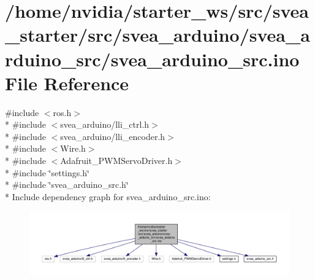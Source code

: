 \hypertarget{svea__arduino__src_8ino}{}\section{/home/nvidia/starter\+\_\+ws/src/svea\+\_\+starter/src/svea\+\_\+arduino/svea\+\_\+arduino\+\_\+src/svea\+\_\+arduino\+\_\+src.ino File Reference}
\label{svea__arduino__src_8ino}
{\ttfamily \#include $<$ros.\+h$>$}\\*
{\ttfamily \#include $<$svea\+\_\+arduino/lli\+\_\+ctrl.\+h$>$}\\*
{\ttfamily \#include $<$svea\+\_\+arduino/lli\+\_\+encoder.\+h$>$}\\*
{\ttfamily \#include $<$Wire.\+h$>$}\\*
{\ttfamily \#include $<$Adafruit\+\_\+\+P\+W\+M\+Servo\+Driver.\+h$>$}\\*
{\ttfamily \#include \char`\"{}settings.\+h\char`\"{}}\\*
{\ttfamily \#include \char`\"{}svea\+\_\+arduino\+\_\+src.\+h\char`\"{}}\\*
Include dependency graph for svea\+\_\+arduino\+\_\+src.\+ino\+:
\nopagebreak
\begin{figure}[H]
\begin{center}
\leavevmode
\includegraphics[width=350pt]{svea__arduino__src_8ino__incl}
\end{center}
\end{figure}
